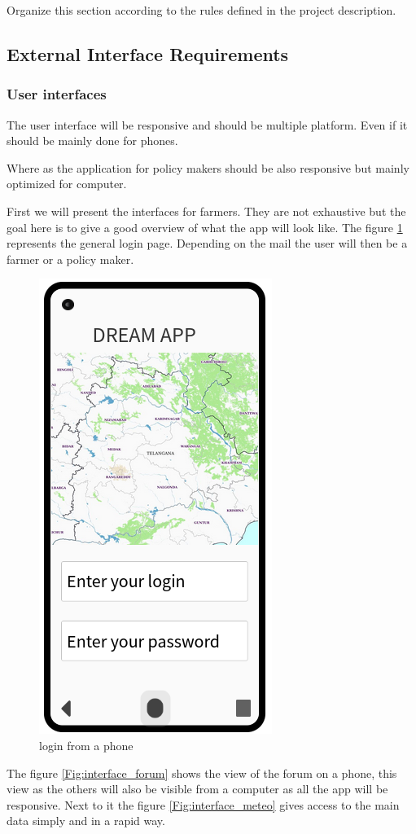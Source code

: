 Organize this section according to the rules defined in the project description. 

\subsection{External Interface Requirements}
\subsubsection{User interfaces}
The user interface will be responsive and should be multiple platform. Even if it should be mainly done for phones. \newline

Where as the application for policy makers should be also responsive but mainly optimized for computer.



First we will present the interfaces for farmers. They are not exhaustive but the goal here is to give a good overview of what the app will look like. The figure \ref{Fig:interface_login} represents the general login page. Depending on the mail the user will then be a farmer or a policy maker.

\begin{figure}[H]

	\centering

	\includegraphics[width=0.2\columnwidth]{Images/login.png}

	\caption{login from a phone}

	\label{Fig:interface_login}

\end{figure}



The figure \ref{Fig:interface_forum} shows the view of the forum on a phone, this view as the others will also be visible from a computer as all the app will be responsive. Next to it the figure \ref{Fig:interface_meteo} gives access to the main data simply and in a rapid way.

